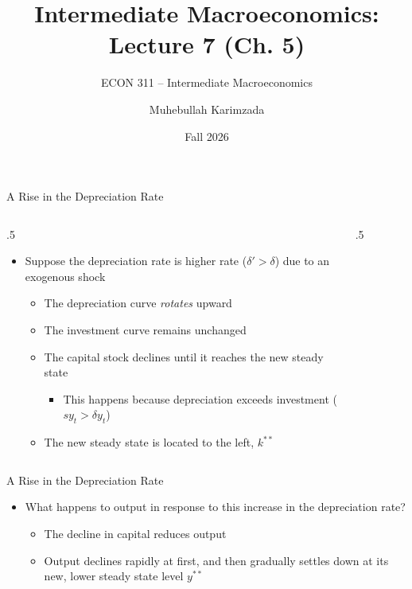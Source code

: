 \documentclass[aspectratio=1610]{beamer}
\title[Fall - Lecture 7] %
{Intermediate Macroeconomics: Lecture  7 (Ch. 5)}
\subtitle{ECON 311 -- Intermediate Macroeconomics}
\author{Muhebullah Karimzada}
\institute{School of Economics \\\ University of Northern British Columbia}
\date{Fall 2026}
\begin{document}
\begin{frame}[plain]
  \titlepage
\end{frame}

\begin{frame}[wide]{A Rise in the Depreciation Rate}
	\begin{columns} 
		\begin{column}{.5\textwidth}
			\begin{itemize}
				\item Suppose the depreciation rate is higher rate ($\delta'>\delta$) due to an exogenous shock
				\vspace{1mm}
				\begin{itemize}
					\item The depreciation curve \textit{rotates} upward
					\item The investment curve remains unchanged
					\item The capital stock declines until it reaches the new steady state
					\vspace{1mm}
					\begin{itemize}
						\item This happens because depreciation exceeds investment ($sy_t>\delta y_t$)
					\end{itemize}
					\item The new steady state is located to the left, $k^{**}$
				\end{itemize}
			\end{itemize}
		\end{column}
		\begin{column}{.5\textwidth}			
			\begin{figure}
				\centering
			\end{figure}
		\end{column}%
	\end{columns}
\end{frame}

\begin{frame}[wide]{A Rise in the Depreciation Rate}
	\begin{itemize}
		\item What happens to output in response to this increase in the depreciation rate?
		\begin{itemize}
			\item The decline in capital reduces output
			\item Output declines rapidly at ﬁrst, and then gradually settles down at its new, lower steady state level $y^{**}$
		\end{itemize}
	\end{itemize}
\end{frame}
\end{document}
